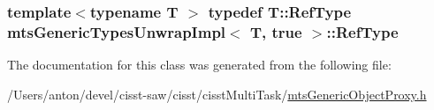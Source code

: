 \subsubsection[{Ref\+Type}]{\setlength{\rightskip}{0pt plus 5cm}template$<$typename T $>$ typedef T\+::\+Ref\+Type {\bf mts\+Generic\+Types\+Unwrap\+Impl}$<$ T, true $>$\+::{\bf Ref\+Type}}\label{classmts_generic_types_unwrap_impl_3_01_t_00_01true_01_4_a9b39b8e29d3c298535f6ee83a35efcbf}


The documentation for this class was generated from the following file\+:\begin{DoxyCompactItemize}
\item 
/\+Users/anton/devel/cisst-\/saw/cisst/cisst\+Multi\+Task/\hyperlink{mts_generic_object_proxy_8h}{mts\+Generic\+Object\+Proxy.\+h}\end{DoxyCompactItemize}
